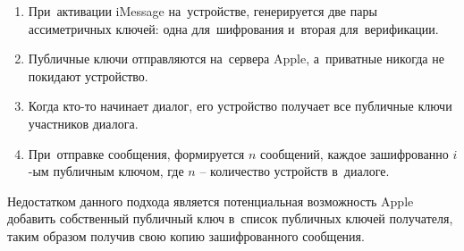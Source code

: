 \begin{enumerate}
	\item При~активации iMessage на~устройстве, генерируется две пары ассиметричных ключей: одна для~шифрования и~вторая для~верификации.
	\item Публичные ключи отправляются на~сервера Apple, а~приватные никогда не покидают устройство.
	\item Когда кто-то начинает диалог, его устройство получает все публичные ключи участников диалога.
	\item При~отправке сообщения, формируется \(n\) сообщений, каждое зашифрованно \(i\)-ым публичным ключом, где \(n\) -- количество устройств в~диалоге.
\end{enumerate}

Недостатком данного подхода является потенциальная возможность Apple добавить собственный публичный ключ в~список публичных ключей получателя, таким образом получив свою копию зашифрованного сообщения.
